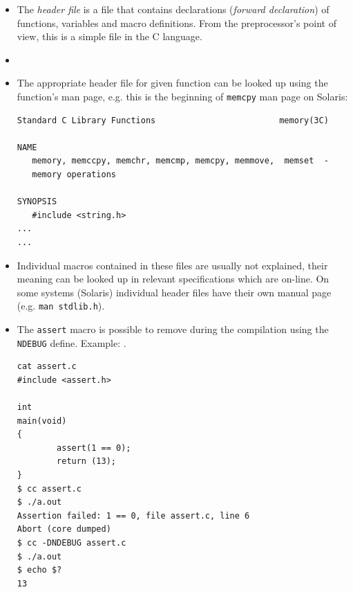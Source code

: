 \begin{itemize}
\item The \emph{header file} is a file that contains declarations 
(\emph{forward declaration}) of functions, variables and macro definitions.
From the preprocessor's point of view, this is a simple file in the C language.
\item {}
\item The appropriate header file for given function can be looked up using the
function's man page, e.g. this is the beginning of \texttt{memcpy} man page
on Solaris:
\begin{verbatim}
Standard C Library Functions                         memory(3C)

NAME
   memory, memccpy, memchr, memcmp, memcpy, memmove,  memset  -
   memory operations

SYNOPSIS
   #include <string.h>
...
...
\end{verbatim}
\item Individual macros contained in these files are usually not explained,
their meaning can be looked up in relevant specifications which are on-line.
On some systems (Solaris) individual header files have their own manual page
(e.g. \texttt{man stdlib.h}).
\item The \texttt{assert} macro is possible to remove during the compilation
using the \texttt{NDEBUG} define. Example: .

\begin{verbatim}
cat assert.c 
#include <assert.h>

int
main(void)
{
        assert(1 == 0);
        return (13);
}
$ cc assert.c 
$ ./a.out 
Assertion failed: 1 == 0, file assert.c, line 6
Abort (core dumped)
$ cc -DNDEBUG assert.c 
$ ./a.out 
$ echo $?
13
\end{verbatim}
\end{itemize}




